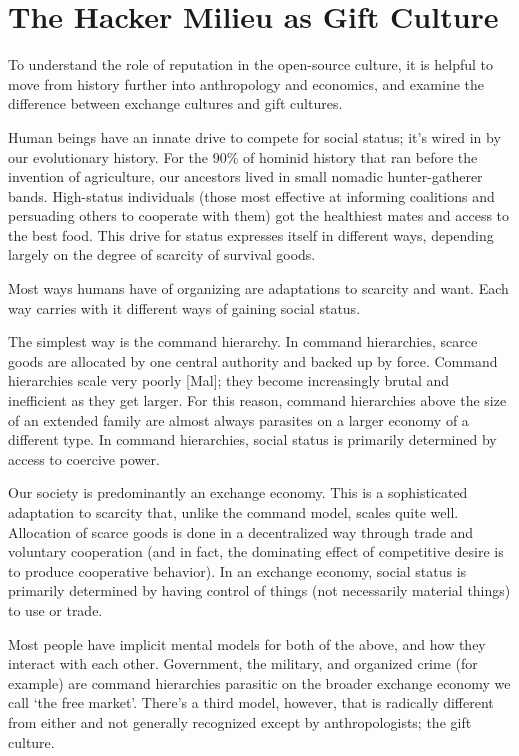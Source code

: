\section{The Hacker Milieu as Gift Culture}


To understand the role of reputation in the open-source culture, it is helpful
to move from history further into anthropology and economics, and examine the
difference between exchange cultures and gift cultures.

Human beings have an innate drive to compete for social status; it's wired in by
our evolutionary history.  For the 90\% of hominid history that ran before the
invention of agriculture, our ancestors lived in small nomadic hunter-gatherer
bands.  High-status individuals (those most effective at informing coalitions
and persuading others to cooperate with them) got the healthiest mates and
access to the best food.  This drive for status expresses itself in different
ways, depending largely on the degree of scarcity of survival goods.

Most ways humans have of organizing are adaptations to scarcity and want.  Each
way carries with it different ways of gaining social status.

The simplest way is the command hierarchy.  In command hierarchies, scarce goods
are allocated by one central authority and backed up by force.  Command
hierarchies scale very poorly [Mal]; they become increasingly brutal and
inefficient as they get larger.  For this reason, command hierarchies above the
size of an extended family are almost always parasites on a larger economy of a
different type.  In command hierarchies, social status is primarily determined
by access to coercive power.

Our society is predominantly an exchange economy.  This is a sophisticated
adaptation to scarcity that, unlike the command model, scales quite well.
Allocation of scarce goods is done in a decentralized way through trade and
voluntary cooperation (and in fact, the dominating effect of competitive desire
is to produce cooperative behavior).  In an exchange economy, social status is
primarily determined by having control of things (not necessarily material
things) to use or trade.

Most people have implicit mental models for both of the above, and how they
interact with each other.  Government, the military, and organized crime (for
example) are command hierarchies parasitic on the broader exchange economy we
call `the free market'.  There's a third model, however, that is radically
different from either and not generally recognized except by anthropologists;
the gift culture.

